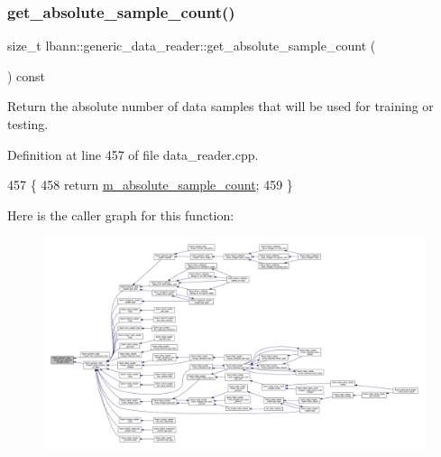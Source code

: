\subsubsection{\texorpdfstring{get\+\_\+absolute\+\_\+sample\+\_\+count()}{get\_absolute\_sample\_count()}}
{\footnotesize\ttfamily size\+\_\+t lbann\+::generic\+\_\+data\+\_\+reader\+::get\+\_\+absolute\+\_\+sample\+\_\+count (\begin{DoxyParamCaption}{ }\end{DoxyParamCaption}) const\hspace{0.3cm}{\ttfamily [protected]}}

Return the absolute number of data samples that will be used for training or testing. 

Definition at line 457 of file data\+\_\+reader.\+cpp.


\begin{DoxyCode}
457                                                             \{
458   \textcolor{keywordflow}{return} \hyperlink{classlbann_1_1generic__data__reader_a462437ed899bc26ebec9ab2091980d0c}{m\_absolute\_sample\_count};
459 \}
\end{DoxyCode}
Here is the caller graph for this function\+:\nopagebreak
\begin{figure}[H]
\begin{center}
\leavevmode
\includegraphics[width=350pt]{classlbann_1_1generic__data__reader_a1e8655cd1883d850566694bcf2ad60ab_icgraph}
\end{center}
\end{figure}
\mbox{\label{classlbann_1_1generic__data__reader_a65b9d39e7585ec325eb40a123cd70891}} 
